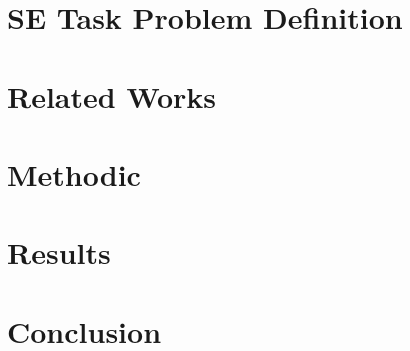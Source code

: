\section{SE Task Problem Definition}


\section{Related Works}

\section{Methodic}

\section{Results}

\section{Conclusion}

